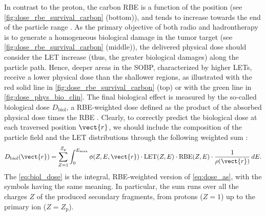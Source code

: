 In contrast to the proton, the carbon RBE is a function of the position (see \autoref{fig:dose_rbe_survival_carbon} (bottom)), and tends to increase towards the end of the particle range \cite{Byun2021-rz}. As the primary objective of both radio and hadrontherapy is to generate a homogeneous biological damage in the tumor target (see \autoref{fig:dose_rbe_survival_carbon} (middle)), the delivered physical dose should consider the LET increase (thus, the greater biological damages) along the particle path. Hence, deeper areas in the SOBP, characterized by higher LETs, receive a lower physical dose than the shallower regions, as illustrated with the red solid line in \autoref{fig:dose_rbe_survival_carbon} (top) or with the green line in \autoref{fig:dose_phys_bio_clin}. The final biological effect is measured by the so-called biological dose $D_\text{biol}$, a RBE-weighted dose defined as the product of the absorbed physical dose times the RBE \cite{Data2025-ty}. Clearly, to correctly predict the biological dose at each traversed position $\vect{r}$, we should include the composition of the particle field and the LET distributions through the following weighted sum \cite{Gunzert-Marx_2008}:
\begin{equation}
	D_{\text{biol}}(\vect{r})
	=
	\sum_{Z=1}^{Z_\text{p}}
	\int_{0}^{E_{\max}}
	\phi(Z,E,\vect{r})\cdot
	\text{LET}(Z,E)\cdot
	\text{RBE}(Z,E)\cdot
	\frac{1}{\rho(\vect{r})}\,dE.
	\label{eq:biol_dose}
\end{equation}
The \autoref{eq:biol_dose} is the integral, RBE-weighted version of \autoref{eq:dose_as}, with the symbols having the same meaning. In particular, the sum runs over all the charges $Z$ of the produced secondary fragments, from protons ($Z=1$) up to the primary ion ($Z=Z_\text{p}$).
